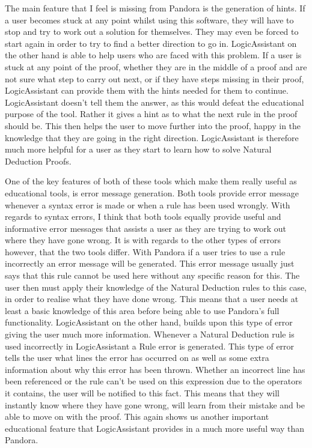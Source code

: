 The main feature that I feel is missing from Pandora is the generation of hints. If a user becomes stuck at any point whilst using this software, they will have to stop and try to work out a solution for themselves. They may even be forced to start again in order to try to find a better direction to go in. LogicAssistant on the other hand is able to help users who are faced with this problem. If a user is stuck at any point of the proof, whether they are in the middle of a proof and are not sure what step to carry out next, or if they have steps missing in their proof, LogicAssistant can provide them with the hints needed for them to continue. LogicAssistant doesn't tell them the answer, as this would defeat the educational purpose of the tool. Rather it gives a hint as to what the next rule in the proof should be. This then helps the user to move further into the proof, happy in the knowledge that they are going in the right direction. LogicAssistant is therefore much more helpful for a user as they start to learn how to solve Natural Deduction Proofs.

One of the key features of both of these tools which make them really useful as educational tools, is error message generation. Both tools provide error message whenever a syntax error is made or when a rule has been used wrongly. With regards to syntax errors, I think that both tools equally provide useful and informative error messages that assists a user as they are trying to work out where they have gone wrong. It is with regards to the other types of errors however, that the two tools differ. With Pandora if a user tries to use a rule incorrectly an error message will be generated. This error message usually just says that this rule cannot be used here without any specific reason for this. The user then must apply their knowledge of the Natural Deduction rules to this case, in order to realise what they have done wrong. This means that a user needs at least a basic knowledge of this area before being able to use Pandora's full functionality. LogicAssistant on the other hand, builds upon this type of error giving the user much more information. Whenever a Natural Deduction rule is used incorrectly in LogicAssistant a Rule error is generated. This type of error tells the user what lines the error has occurred on as well as some extra information about why this error has been thrown. Whether an incorrect line has been referenced or the rule can't be used on this expression due to the operators it contains, the user will be notified to this fact. This means that they will instantly know where they have gone wrong, will learn from their mistake and be able to move on with the proof. This again shows us another important educational feature that LogicAssistant provides in a much more useful way than Pandora.

